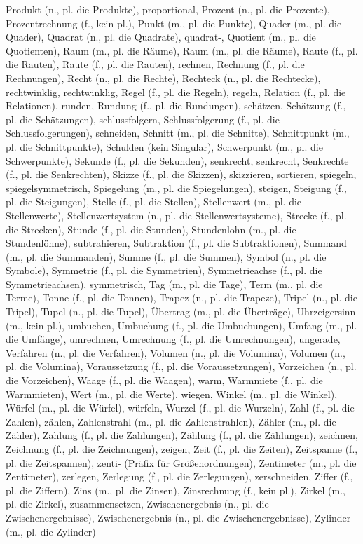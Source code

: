 Produkt (n., pl. die Produkte),
proportional,
Prozent (n., pl. die Prozente),
Prozentrechnung (f., kein pl.),
Punkt (m., pl. die Punkte),
Quader (m., pl. die Quader),
Quadrat (n., pl. die Quadrate),
quadrat-,
Quotient (m., pl. die Quotienten),
Raum (m., pl. die Räume),
Raum (m., pl. die Räume),
Raute (f., pl. die Rauten),
Raute (f., pl. die Rauten),
rechnen,
Rechnung (f., pl. die Rechnungen),
Recht (n., pl. die Rechte),
Rechteck (n., pl. die Rechtecke),
rechtwinklig,
rechtwinklig,
Regel (f., pl. die Regeln),
regeln,
Relation (f., pl. die Relationen),
runden,
Rundung (f., pl. die Rundungen),
schätzen,
Schätzung (f., pl. die Schätzungen),
schlussfolgern,
Schlussfolgerung (f., pl. die Schlussfolgerungen),
schneiden,
Schnitt (m., pl. die Schnitte),
Schnittpunkt (m., pl. die Schnittpunkte),
Schulden (kein Singular),
Schwerpunkt (m., pl. die Schwerpunkte),
Sekunde (f., pl. die Sekunden),
senkrecht,
senkrecht,
Senkrechte (f., pl. die Senkrechten),
Skizze (f., pl. die Skizzen),
skizzieren,
sortieren,
spiegeln,
spiegelsymmetrisch,
Spiegelung (m., pl. die Spiegelungen),
steigen,
Steigung (f., pl. die Steigungen),
Stelle (f., pl. die Stellen),
Stellenwert (m., pl. die Stellenwerte),
Stellenwertsystem (n., pl. die Stellenwertsysteme),
Strecke (f., pl. die Strecken),
Stunde (f., pl. die Stunden),
Stundenlohn (m., pl. die Stundenlöhne),
subtrahieren,
Subtraktion (f., pl. die Subtraktionen),
Summand (m., pl. die Summanden),
Summe (f., pl. die Summen),
Symbol (n., pl. die Symbole),
Symmetrie (f., pl. die Symmetrien),
Symmetrieachse (f., pl. die Symmetrieachsen),
symmetrisch,
Tag (m., pl. die Tage),
Term (m., pl. die Terme),
Tonne (f., pl. die Tonnen),
Trapez (n., pl. die Trapeze),
Tripel (n., pl. die Tripel),
Tupel (n., pl. die Tupel),
Übertrag (m., pl. die Überträge),
Uhrzeigersinn (m., kein pl.),
umbuchen,
Umbuchung (f., pl. die Umbuchungen),
Umfang (m., pl. die Umfänge),
umrechnen,
Umrechnung (f., pl. die Umrechnungen),
ungerade,
Verfahren (n., pl. die Verfahren),
Volumen (n., pl. die Volumina),
Volumen (n., pl. die Volumina),
Voraussetzung (f., pl. die Voraussetzungen),
Vorzeichen (n., pl. die Vorzeichen),
Waage (f., pl. die Waagen),
warm,
Warmmiete (f., pl. die Warmmieten),
Wert (m., pl. die Werte),
wiegen,
Winkel (m., pl. die Winkel),
Würfel (m., pl. die Würfel),
würfeln,
Wurzel (f., pl. die Wurzeln),
Zahl (f., pl. die Zahlen),
zählen,
Zahlenstrahl (m., pl. die Zahlenstrahlen),
Zähler (m., pl. die Zähler),
Zahlung (f., pl. die Zahlungen),
Zählung (f., pl. die Zählungen),
zeichnen,
Zeichnung (f., pl. die Zeichnungen),
zeigen,
Zeit (f., pl. die Zeiten),
Zeitspanne (f., pl. die Zeitspannen),
zenti- (Präfix für Größenordnungen),
Zentimeter (m., pl. die Zentimeter),
zerlegen,
Zerlegung (f., pl. die Zerlegungen),
zerschneiden,
Ziffer (f., pl. die Ziffern),
Zins (m., pl. die Zinsen),
Zinsrechnung (f., kein pl.),
Zirkel (m., pl. die Zirkel),
zusammensetzen,
Zwischenergebnis (n., pl. die Zwischenergebnisse),
Zwischenergebnis (n., pl. die Zwischenergebnisse),
Zylinder (m., pl. die Zylinder) 